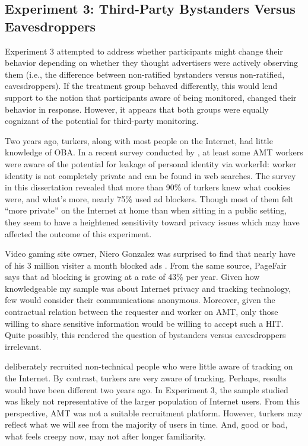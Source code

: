 \subsection{Experiment 3: Third-Party Bystanders Versus Eavesdroppers}
\label{experiment3:third-partybystandersversuseavesdroppers}

Experiment 3 attempted to address whether participants might change their behavior depending on whether they thought advertisers were actively observing them (i.e., the difference between non-ratified bystanders versus non-ratified, eavesdroppers). If the treatment group behaved differently, this would lend support to the notion that participants aware of being monitored, changed their behavior in response. However, it appears that both groups were equally cognizant of the potential for third-party monitoring. 

Two years ago, turkers, along with most people on the Internet, had little knowledge of OBA. In a recent survey conducted by  \citet{Lease:2013vq},  at least some AMT workers were aware of the potential for leakage of personal identity via workerId: worker identity is not completely private and can be found in web searches. The survey in this dissertation revealed that more than 90\% of turkers knew what cookies were, and what's more, nearly 75\% used ad blockers. Though most of them felt ``more private'' on the Internet at home than when sitting in a public setting, they seem to have a heightened sensitivity toward privacy issues which may have affected the outcome of this experiment.

Video gaming site owner, Niero Gonzalez was surprised to find that nearly have of his 3 million visiter a month blocked ads  \citep{Hill:2013wp}.  From the same source, PageFair says that ad blocking is growing at a rate of 43\% per year. Given how knowledgeable my sample was about Internet privacy and tracking technology, few would consider their communications anonymous. Moreover, given the contractual relation between the requester and worker on AMT, only those willing to share sensitive information would be willing to accept such a HIT. Quite possibly, this rendered the question of bystanders versus eavesdroppers irrelevant.

 \citet{Ur:2012ws}  deliberately recruited non-technical people who were little aware of tracking on the Internet. By contrast, turkers are very aware of tracking. Perhaps, results would have been different two years ago. In Experiment 3, the sample studied was likely not representative of the larger population of Internet users. From this perspective, AMT was not a suitable recruitment platform. However, turkers may reflect what we will see from the majority of users in time. And, good or bad, what feels creepy now, may not after longer familiarity.

